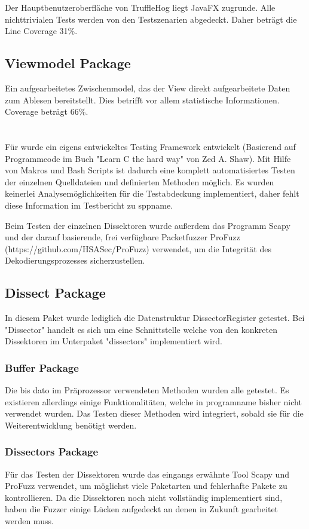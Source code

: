 Der Hauptbenutzeroberfläche von TruffleHog liegt JavaFX zugrunde. Alle nichttrivialen Tests werden von den Testszenarien abgedeckt. Daher beträgt die Line Coverage 31\%.

\subsection{Viewmodel Package}

Ein aufgearbeitetes Zwischenmodel, das der View direkt aufgearbeitete Daten zum Ablesen bereitstellt. Dies betrifft vor allem statistische Informationen. Coverage beträgt 66\%.

\section{\sppname}
Für \sppname wurde ein eigens entwickeltes Testing Framework entwickelt (Basierend auf Programmcode im Buch "Learn C the hard way" von Zed A. Shaw). Mit Hilfe von Makros und Bash Scripts ist dadurch eine komplett automatisiertes Testen der einzelnen Quelldateien und definierten Methoden möglich. Es wurden keinerlei Analysemöglichkeiten für die Testabdeckung implementiert, daher fehlt diese Information im Testbericht zu \gls{sppname}.

Beim Testen der einzelnen Dissektoren wurde außerdem das Programm Scapy und der darauf basierende, frei verfügbare Packetfuzzer ProFuzz (https://github.com/HSASec/ProFuzz) verwendet, um die Integrität des Dekodierungsprozesses sicherzustellen.

	\subsection{Dissect Package}
	In diesem Paket wurde lediglich die Datenstruktur DissectorRegister getestet. Bei "Dissector"{} handelt es sich um eine Schnittstelle welche von den konkreten Dissektoren im Unterpaket "dissectors" implementiert wird.
	
		\subsubsection{Buffer Package}
		Die bis dato im Präprozessor verwendeten Methoden wurden alle getestet. Es existieren allerdings einige Funktionalitäten, welche in \gls{programname} bisher nicht verwendet wurden. Das Testen dieser Methoden wird integriert, sobald sie für die Weiterentwicklung benötigt werden.
		
		\subsubsection{Dissectors Package}
		Für das Testen der Dissektoren wurde das eingangs erwähnte Tool Scapy und ProFuzz verwendet, um möglichst viele Paketarten und fehlerhafte Pakete zu kontrollieren. Da die Dissektoren noch nicht vollständig implementiert sind, haben die Fuzzer einige Lücken aufgedeckt an denen in Zukunft gearbeitet werden muss.
		

